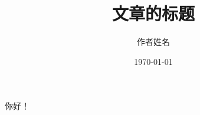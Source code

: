 \documentclass[UTF8]{ctexart}
\title{文章的标题}
\author{作者姓名}
\date{\today}
\begin{document}
\maketitle
    你好！
\end{document}
